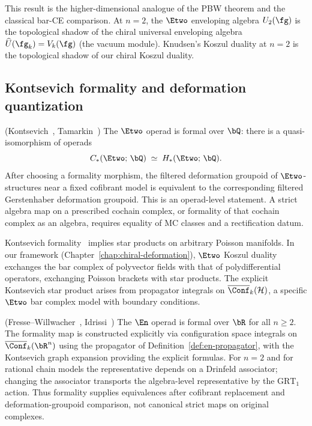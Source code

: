 This result is the higher-dimensional analogue of the PBW theorem
and the classical bar-CE comparison. At $n = 2$, the $\Etwo$
enveloping algebra $U_2(\fg)$ is the topological shadow of the
chiral universal enveloping algebra
$\widehat{U}(\fg_k) = V_k(\fg)$ (the vacuum module). Knudsen's
Koszul duality at $n = 2$ is the topological shadow of our chiral
Koszul duality.


\subsection{Kontsevich formality and deformation quantization}

\begin{theorem}
\label{thm:e2-formality}
\textup{(}Kontsevich~\cite{Kon03},
Tamarkin~\cite{Tamarkin00}\textup{)}\quad
The $\Etwo$ operad is formal over $\bQ$: there is a
quasi-isomorphism of operads
\[
C_*(\Etwo;\, \bQ)
\;\simeq\;
H_*(\Etwo;\, \bQ).
\]
After choosing a formality morphism, the filtered deformation
groupoid of $\Etwo$-structures near a fixed cofibrant model is
equivalent to the corresponding filtered Gerstenhaber deformation
groupoid. This is an operad-level statement. A strict algebra map on
a prescribed cochain complex, or formality of that cochain complex
as an algebra, requires equality of MC classes and a rectification
datum.
\end{theorem}

\begin{remark}
\label{rem:formality-dq}
Kontsevich formality~\cite{Kon03} implies star products on
arbitrary Poisson manifolds. In our framework
(Chapter~\ref{chap:chiral-deformation}), $\Etwo$ Koszul duality
exchanges the bar complex of polyvector fields with that of
polydifferential operators, exchanging Poisson brackets with star products.
The explicit Kontsevich star product arises from propagator integrals
on $\overline{\Conf}_k(\mathcal{H})$, a specific $\Etwo$ bar complex
model with boundary conditions.
\end{remark}

\begin{proposition}[\texorpdfstring{$\En$}{En} formality for \texorpdfstring{$n \geq 2$}{n >= 2};
\ClaimStatusProvedElsewhere]
\label{prop:en-formality}
\textup{(}Fresse--Willwacher~\cite{FresseWillwacher20}, Idrissi~\cite{Idrissi22}\textup{)}\quad
The $\En$ operad is formal over $\bR$ for all $n \geq 2$.
The formality map is constructed explicitly via configuration
space integrals on $\overline{\Conf}_k(\bR^n)$ using the propagator
of Definition~\textup{\ref{def:en-propagator}}, with the Kontsevich
graph expansion providing the explicit formulas.
For $n=2$ and for rational chain models the representative depends
on a Drinfeld associator; changing the associator transports the
algebra-level representative by the $\mathrm{GRT}_1$ action. Thus
formality supplies equivalences after cofibrant replacement and
deformation-groupoid comparison, not canonical strict maps on
original complexes.
\end{proposition}


